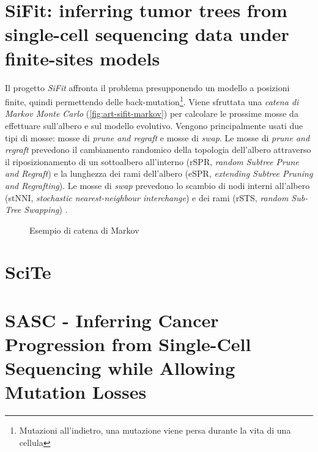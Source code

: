 
\section{SiFit: inferring tumor trees from single-cell sequencing data under finite-sites models}
\label{chap:art-sifit}
Il progetto \textit{SiFit} affronta il problema presupponendo un modello a posizioni finite, quindi permettendo delle back-mutation\footnote{Mutazioni all'indietro, una mutazione viene persa durante la vita di una cellula}. Viene sfruttata una \textit{catena di Markov Monte Carlo} (\autoref{fig:art-sifit-markov}) per calcolare le prossime mosse da effettuare sull'albero e sul modello evolutivo. Vengono principalmente usati due tipi di mosse: mosse di \textit{prune and regraft} e mosse di \textit{swap}. Le mosse di \textit{prune and regraft} prevedono il cambiamento randomico della topologia dell'albero attraverso il riposizionamento di un sottoalbero all'interno (rSPR, \textit{random Subtree Prune and Regraft}) e la lunghezza dei rami dell'albero (eSPR, \textit{extending Subtree Pruning and Regrafting}). Le mosse di \textit{swap} prevedono lo scambio di nodi interni all'albero (stNNI, \textit{stochastic nearest-neighbour interchange}) e dei rami (rSTS, \textit{random Sub-Tree Swapping}) \cite{sifit, efficiencymcmc}.

\begin{figure}[h]
    \centering
     \caption{Esempio di catena di Markov}
    \label{fig:art-sifit-markov}
\end{figure}

\section{SciTe}
\label{chap:art-scite}

\section{SASC - Inferring Cancer Progression from Single-Cell Sequencing while Allowing Mutation Losses \cite{SCiccolellaSasc}}
\label{chap:art-sasc}
